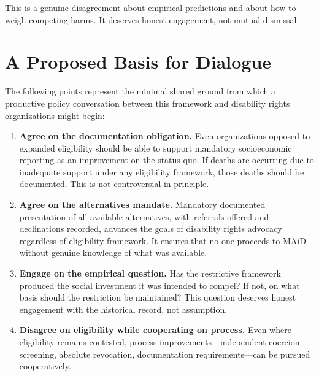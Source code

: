 \documentclass[11pt, letterpaper]{article}
\begin{document}
This is a genuine disagreement about empirical predictions and about how to weigh competing
harms. It deserves honest engagement, not mutual dismissal.

\section{A Proposed Basis for Dialogue}

The following points represent the minimal shared ground from which a productive policy
conversation between this framework and disability rights organizations might begin:

\begin{enumerate}
  \item \textbf{Agree on the documentation obligation.} Even organizations opposed to
    expanded eligibility should be able to support mandatory socioeconomic reporting as
    an improvement on the status quo. If deaths are occurring due to inadequate support
    under any eligibility framework, those deaths should be documented. This is not
    controversial in principle.

  \item \textbf{Agree on the alternatives mandate.} Mandatory documented presentation
    of all available alternatives, with referrals offered and declinations recorded,
    advances the goals of disability rights advocacy regardless of eligibility framework.
    It ensures that no one proceeds to MAiD without genuine knowledge of what was available.

  \item \textbf{Engage on the empirical question.} Has the restrictive framework produced
    the social investment it was intended to compel? If not, on what basis should the
    restriction be maintained? This question deserves honest engagement with the historical
    record, not assumption.

  \item \textbf{Disagree on eligibility while cooperating on process.} Even where
    eligibility remains contested, process improvements---independent coercion screening,
    absolute revocation, documentation requirements---can be pursued cooperatively.
\end{enumerate}
\end{document}
